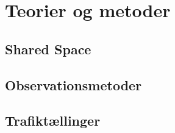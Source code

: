 \chapter{Teorier og metoder}
\label{chap:teorier_og_metoder}

\section{Shared Space}
\label{sec:shared_space}

\section{Observationsmetoder}
\label{sec:observationsmetoder}

\section{Trafiktællinger}
\label{sec:trafiktaellinger}
